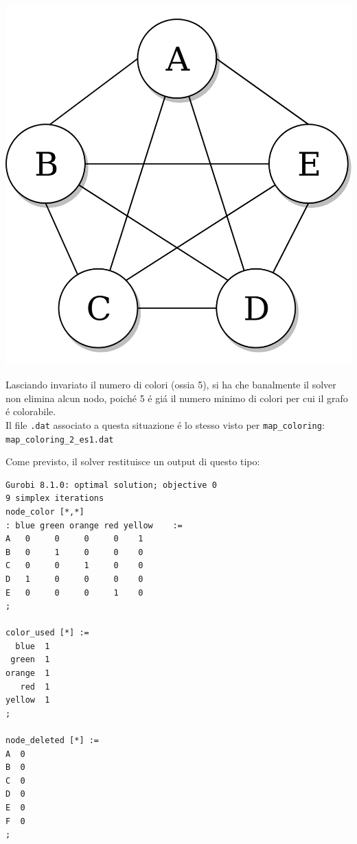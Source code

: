 \documentclass{article}
\begin{document}
\begin{center}
\includegraphics[scale=0.2]{complete_graph.png}
\end{center}

Lasciando invariato il numero di colori (ossia 5), si ha che banalmente il solver non elimina alcun nodo, poich\'e 5 \'e gi\'a il numero  minimo di colori per cui il grafo \'e colorabile.\\
Il file \texttt{.dat} associato a questa situazione \'e lo stesso visto per \texttt{map\_coloring}:\\

\vspace{5mm}
\texttt{map\_coloring\_2\_es1.dat}

\vspace{5mm}

Come previsto, il solver restituisce un output di questo tipo:\\

\begin{verbatim}
Gurobi 8.1.0: optimal solution; objective 0
9 simplex iterations
node_color [*,*]
: blue green orange red yellow    :=
A   0     0     0     0    1
B   0     1     0     0    0
C   0     0     1     0    0
D   1     0     0     0    0
E   0     0     0     1    0
;

color_used [*] :=
  blue  1
 green  1
orange  1
   red  1
yellow  1
;

node_deleted [*] :=
A  0
B  0
C  0
D  0
E  0
F  0
;

\end{verbatim}
\end{document}
